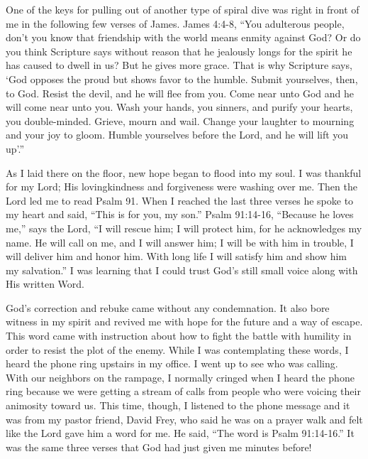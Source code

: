 \documentclass[oneside]{book}
\begin{document}
One of the keys for pulling out of another type of spiral dive was right in front of me in the following few verses of James. James 4:4-8, “You adulterous people, don't you know that friendship with the world means enmity against God? Or do you think Scripture says without reason that he jealously longs for the spirit he has caused to dwell in us? But he gives more grace. That is why Scripture says, ‘God opposes the proud but shows favor to the humble. Submit yourselves, then, to God. Resist the devil, and he will flee from you. Come near unto God and he will come near unto you. Wash your hands, you sinners, and purify your hearts, you double-minded. Grieve, mourn and wail. Change your laughter to mourning and your joy to gloom. Humble yourselves before the Lord, and he will lift you up’.”

As I laid there on the floor, new hope began to flood into my soul. I was thankful for my Lord; His lovingkindness and forgiveness were washing over me. Then the Lord led me to read Psalm 91. When I reached the last three verses he spoke to my heart and said, “This is for you, my son.” Psalm 91:14-16, “Because he loves me,” says the Lord, “I will rescue him; I will protect him, for he acknowledges my name. He will call on me, and I will answer him; I will be with him in trouble, I will deliver him and honor him. With long life I will satisfy him and show him my salvation.” I was learning that I could trust God's still small voice along with His written Word. 


God’s correction and rebuke came without any condemnation. It also bore witness in my spirit and revived me with hope for the future and a way of escape. This word came with instruction about how to fight the battle with humility in order to resist the plot of the enemy. While I was contemplating these words, I heard the phone ring upstairs in my office. I went up to see who was calling. With our neighbors on the rampage, I normally cringed when I heard the phone ring because we were getting a stream of calls from people who were voicing their animosity toward us. This time, though, I listened to the phone message and it was from my pastor friend, David Frey, who said he was on a prayer walk and felt like the Lord gave him a word for me. He said, “The word is Psalm 91:14-16.” It was the same three verses that God had just given me minutes before!
\end{document}
